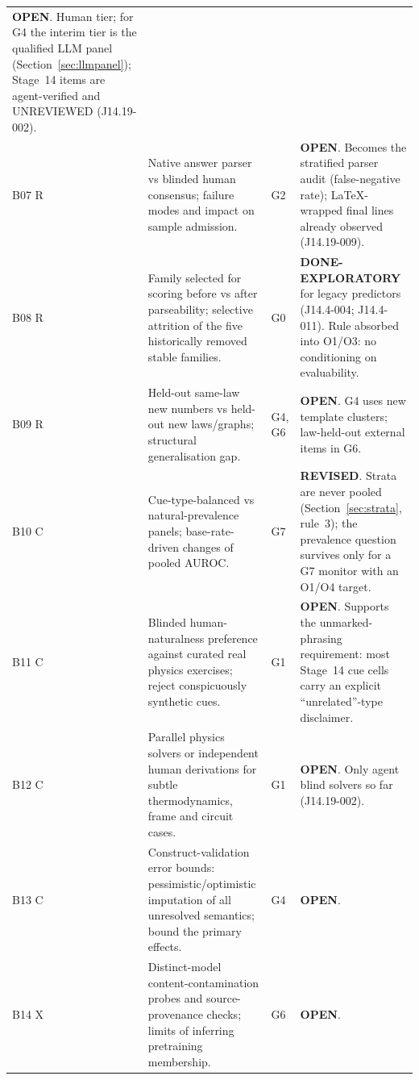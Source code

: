 \documentclass[10pt,a4paper]{article}
\begin{document}
\begin{longtable}{@{}P{1.2cm}P{7.2cm}P{1.3cm}P{5.6cm}@{}}
\textbf{OPEN}. Human tier; for G4 the interim tier is the qualified LLM panel (Section~\ref{sec:llmpanel}); Stage~14 items are agent-verified and UNREVIEWED (J14.19-002). \\
B07 \newline R & Native answer parser vs blinded human consensus; failure modes and impact on sample admission. & G2 &
\textbf{OPEN}. Becomes the stratified parser audit (false-negative rate); LaTeX-wrapped final lines already observed (J14.19-009). \\
B08 \newline R & Family selected for scoring before vs after parseability; selective attrition of the five historically removed stable families. & G0 &
\textbf{DONE-EXPLORATORY} for legacy predictors (J14.4-004; J14.4-011). Rule absorbed into O1/O3: no conditioning on evaluability. \\
B09 \newline R & Held-out same-law new numbers vs held-out new laws/graphs; structural generalisation gap. & G4, G6 &
\textbf{OPEN}. G4 uses new template clusters; law-held-out external items in G6. \\
B10 \newline C & Cue-type-balanced vs natural-prevalence panels; base-rate-driven changes of pooled AUROC. & G7 &
\textbf{REVISED}. Strata are never pooled (Section~\ref{sec:strata}, rule~3); the prevalence question survives only for a G7 monitor with an O1/O4 target. \\
B11 \newline C & Blinded human-naturalness preference against curated real physics exercises; reject conspicuously synthetic cues. & G1 &
\textbf{OPEN}. Supports the unmarked-phrasing requirement: most Stage~14 cue cells carry an explicit ``unrelated''-type disclaimer. \\
B12 \newline C & Parallel physics solvers or independent human derivations for subtle thermodynamics, frame and circuit cases. & G1 &
\textbf{OPEN}. Only agent blind solvers so far (J14.19-002). \\
B13 \newline C & Construct-validation error bounds: pessimistic/optimistic imputation of all unresolved semantics; bound the primary effects. & G4 &
\textbf{OPEN}. \\
B14 \newline X & Distinct-model content-contamination probes and source-provenance checks; limits of inferring pretraining membership. & G6 &
\textbf{OPEN}. \\
\end{longtable}
\endgroup
\end{document}
